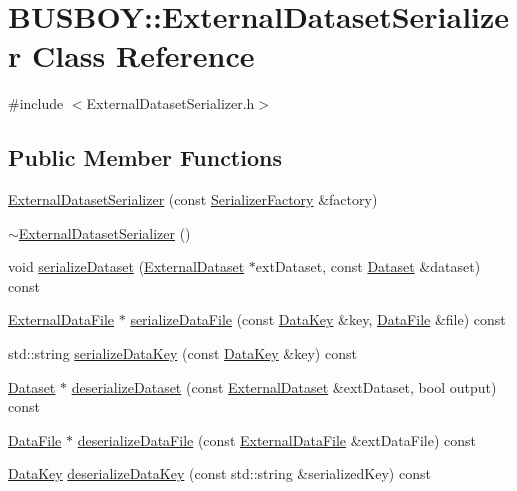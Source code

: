\hypertarget{classBUSBOY_1_1ExternalDatasetSerializer}{
\section{BUSBOY::ExternalDatasetSerializer Class Reference}
\label{classBUSBOY_1_1ExternalDatasetSerializer}
}


{\ttfamily \#include $<$ExternalDatasetSerializer.h$>$}\subsection*{Public Member Functions}
\begin{DoxyCompactItemize}
\item 
\hyperlink{classBUSBOY_1_1ExternalDatasetSerializer_a99d02a449b252c4e4275966427e619ba}{ExternalDatasetSerializer} (const \hyperlink{classBUSBOY_1_1SerializerFactory}{SerializerFactory} \&factory)
\item 
\hyperlink{classBUSBOY_1_1ExternalDatasetSerializer_a3dd3a4b80adb6cb838fd41da30eda5f4}{$\sim$ExternalDatasetSerializer} ()
\item 
void \hyperlink{classBUSBOY_1_1ExternalDatasetSerializer_a2da3f16e76e2eb95aa22113502938620}{serializeDataset} (\hyperlink{classBUSBOY_1_1ExternalDataset}{ExternalDataset} $\ast$extDataset, const \hyperlink{classBUSBOY_1_1Dataset}{Dataset} \&dataset) const 
\item 
\hyperlink{classBUSBOY_1_1ExternalDataFile}{ExternalDataFile} $\ast$ \hyperlink{classBUSBOY_1_1ExternalDatasetSerializer_a7f11a3e1bdb20867ffa58d64c6757c1d}{serializeDataFile} (const \hyperlink{classBUSBOY_1_1DataKey}{DataKey} \&key, \hyperlink{classBUSBOY_1_1DataFile}{DataFile} \&file) const 
\item 
std::string \hyperlink{classBUSBOY_1_1ExternalDatasetSerializer_a7507c700084f55f9146e3987925feb1c}{serializeDataKey} (const \hyperlink{classBUSBOY_1_1DataKey}{DataKey} \&key) const 
\item 
\hyperlink{classBUSBOY_1_1Dataset}{Dataset} $\ast$ \hyperlink{classBUSBOY_1_1ExternalDatasetSerializer_a6f9fc6de312044bd344457e901142dc9}{deserializeDataset} (const \hyperlink{classBUSBOY_1_1ExternalDataset}{ExternalDataset} \&extDataset, bool output) const 
\item 
\hyperlink{classBUSBOY_1_1DataFile}{DataFile} $\ast$ \hyperlink{classBUSBOY_1_1ExternalDatasetSerializer_abb5a5f3669af41ab9825c12ba14f53b9}{deserializeDataFile} (const \hyperlink{classBUSBOY_1_1ExternalDataFile}{ExternalDataFile} \&extDataFile) const 
\item 
\hyperlink{classBUSBOY_1_1DataKey}{DataKey} \hyperlink{classBUSBOY_1_1ExternalDatasetSerializer_aa7fd50e00dfb3a45f32444f3fb5734fa}{deserializeDataKey} (const std::string \&serializedKey) const 
\end{DoxyCompactItemize}


